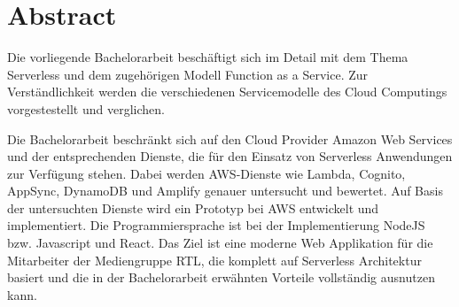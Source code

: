 
\section*{Abstract}

Die vorliegende Bachelorarbeit beschäftigt sich im Detail mit dem Thema Serverless und dem zugehörigen Modell Function as a Service.
Zur Verständlichkeit werden die verschiedenen Servicemodelle des Cloud Computings vorgestestellt und verglichen.

Die Bachelorarbeit beschränkt sich auf den Cloud Provider Amazon Web Services und der entsprechenden Dienste, die für den Einsatz von Serverless Anwendungen zur Verfügung stehen.
Dabei werden AWS-Dienste wie Lambda, Cognito, AppSync, DynamoDB und Amplify genauer untersucht und bewertet.
Auf Basis der untersuchten Dienste wird ein Prototyp bei AWS entwickelt und implementiert. Die Programmiersprache ist bei der Implementierung NodeJS bzw. Javascript und React.
Das Ziel ist eine moderne Web Applikation für die Mitarbeiter der Mediengruppe RTL, die komplett auf Serverless Architektur basiert
und die in der Bachelorarbeit erwähnten Vorteile vollständig ausnutzen kann.




\clearpage
